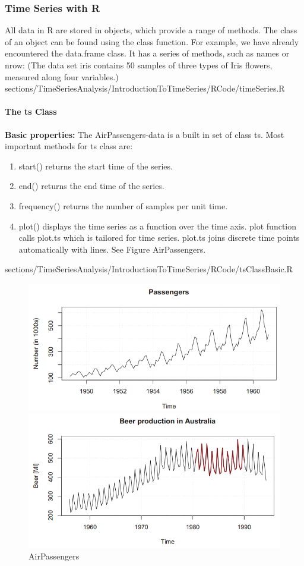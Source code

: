 \subsubsection{Time Series with \color{blue}R}
{
\RTheory
{	All data in {\color{blue}R} are stored in objects, which provide a range of methods. The class of an object can be found using the {\color{blue}class} function. For example, we have already encountered the {\color{blue}data.frame} class. It has a series of methods, such as {\color{blue}names} or {\color{blue}nrow}: \vfill
(The data set iris contains 50 samples of three types of Iris flowers, measured along four variables.)}
{sections/TimeSeriesAnalysis/IntroductionToTimeSeries/RCode/timeSeries.R}
\paragraph{The {\color{blue}ts} Class}
{\RTheory
{\textbf{Basic properties:}\vfill
	The AirPassengers-data is a built in set of class {\color{blue}ts}. Most important methods for {\color{blue}ts} class are:\vfill 
\begin{enumerate}
\item  {\color{blue}start()} returns the start time of the series.
\item  {\color{blue}end()} returns the end time of the series.
\item  {\color{blue}frequency()} returns the number of samples per unit time.
\item  {\color{blue}plot()} displays the time series as a function over the time axis. {\color{blue}plot} function calls {\color{blue}plot.ts} which is tailored for time series. {\color{blue}plot.ts} joins discrete time points automatically with lines.  See Figure AirPassengers. 
\end{enumerate}}
{sections/TimeSeriesAnalysis/IntroductionToTimeSeries/RCode/tsClassBasic.R}
\begin{figure}[H]\centering
	\includegraphics[width=0.7\linewidth]{images/tsAirPassengers.png}
	\caption{AirPassengers}
	\includegraphics[width=0.7\linewidth]{images/tsSeasBehav.png}

\end{figure}}}
